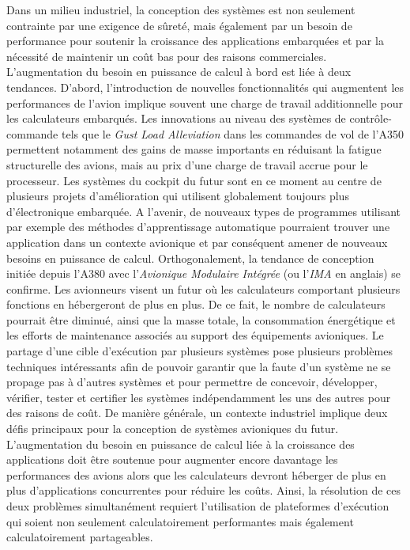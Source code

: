\documentclass[main.tex]{subfiles}
\begin{document}
Dans un milieu industriel, la conception des systèmes est non seulement contrainte par une exigence de sûreté, mais également par un besoin de performance pour soutenir la croissance des applications embarquées et par la nécessité de maintenir un coût bas pour des raisons commerciales. L'augmentation du besoin en puissance de calcul à bord est liée à deux tendances. D'abord, l'introduction de nouvelles fonctionnalités qui augmentent les performances de l'avion implique souvent une charge de travail additionnelle pour les calculateurs embarqués. Les innovations au niveau des systèmes de contrôle-commande tels que le \emph{Gust Load Alleviation} dans les commandes de vol de l'A350 permettent notamment des gains de masse importants en réduisant la fatigue structurelle des avions, mais au prix d'une charge de travail accrue pour le processeur. Les systèmes du cockpit du futur sont en ce moment au centre de plusieurs projets d'amélioration qui utilisent globalement toujours plus d'électronique embarquée. A l'avenir, de nouveaux types de programmes utilisant par exemple des méthodes d'apprentissage automatique pourraient trouver une application dans un contexte avionique et par conséquent amener de nouveaux besoins en puissance de calcul. Orthogonalement, la tendance de conception initiée depuis l'A380 avec l'\emph{Avionique Modulaire Intégrée} (ou l'\emph{IMA} en anglais) se confirme. Les avionneurs visent un futur où les calculateurs comportant plusieurs fonctions en hébergeront de plus en plus. De ce fait, le nombre de calculateurs pourrait être diminué, ainsi que la masse totale, la consommation énergétique et les efforts de maintenance associés au support des équipements avioniques. Le partage d'une cible d'exécution par plusieurs systèmes pose plusieurs problèmes techniques intéressants afin de pouvoir garantir que la faute d'un système ne se propage pas à d'autres systèmes et pour permettre de concevoir, développer, vérifier, tester et certifier les systèmes indépendamment les uns des autres pour des raisons de coût.
De manière générale, un contexte industriel implique deux défis principaux pour la conception de systèmes avioniques du futur. L'augmentation du besoin en puissance de calcul liée à la croissance des applications doit être soutenue pour augmenter encore davantage les performances des avions alors que les calculateurs devront héberger de plus en plus d'applications concurrentes pour réduire les coûts. Ainsi, la résolution de ces deux problèmes simultanément requiert l'utilisation de plateformes d'exécution qui soient non seulement calculatoirement performantes mais également calculatoirement partageables.
\end{document}
